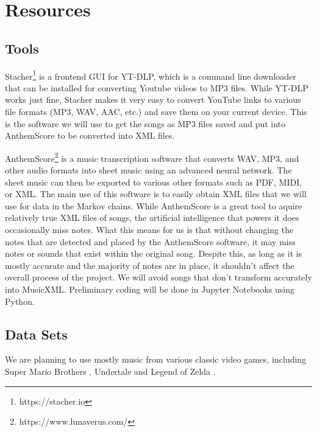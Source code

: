 \documentclass{article}
\begin{document}
\section{Resources}
\subsection{Tools}
Stacher\footnote{https://stacher.io} is a frontend GUI for YT-DLP, which is a command line downloader that can be installed for converting Youtube videos to MP3 files.
While YT-DLP works just fine, Stacher makes it very easy to convert YouTube links to various file formats (MP3, WAV, AAC, etc.) and save them on your current device. This 
is the software we will use to get the songs as MP3 files saved and put into AnthemScore to be converted into XML files.

AnthemScore\footnote{https://www.lunaverus.com/} is a music transcription software that converts WAV, MP3, and other audio formats into sheet music using an advanced 
neural network. The sheet music can then be exported to various other formats such as PDF, MIDI, or XML. The main use of this software is to easily obtain XML files that 
we will use for data in the Markov chains. While AnthemScore is a great tool to aquire relatively true XML files of songs, the artificial intelligence that powers it does 
occasionally miss notes. What this means for us is that without changing the notes that are detected and placed by the AnthemScore software, it may miss notes or sounds 
that exist within the original song. Despite this, as long as it is mostly accurate and the majority of notes are in place, it shouldn't affect the overall process of the 
project. We will avoid songs that don't transform accurately into MusicXML. Preliminary coding will be done in Jupyter Notebooks using Python. 

\subsection{Data Sets}
We are planning to use mostly music from various classic video games, including Super Mario Brothers \cite{kondo_2009},
Undertale \cite{fox_2017} and Legend of Zelda \cite{nakatsuka_2009}.



\end{document}
